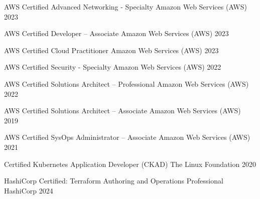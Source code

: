 


\begin{cvhonors}

  \cvhonor
    {AWS Certified Advanced Networking - Specialty} %
    {Amazon Web Services (AWS)} %
    {} %
    {2023} %

  \cvhonor
    {AWS Certified Developer – Associate} %
    {Amazon Web Services (AWS)} %
    {} %
    {2023} %

  \cvhonor
    {AWS Certified Cloud Practitioner} %
    {Amazon Web Services (AWS)} %
    {} %
    {2023} %

  \cvhonor
    {AWS Certified Security - Specialty} %
    {Amazon Web Services (AWS)} %
    {} %
    {2022} %

  \cvhonor
    {AWS Certified Solutions Architect – Professional} %
    {Amazon Web Services (AWS)} %
    {} %
    {2022} %

  \cvhonor
    {AWS Certified Solutions Architect – Associate} %
    {Amazon Web Services (AWS)} %
    {} %
    {2019} %

  \cvhonor
    {AWS Certified SysOps Administrator – Associate} %
    {Amazon Web Services (AWS)} %
    {} %
    {2021} %

  \cvhonor
    {Certified Kubernetes Application Developer (CKAD)} %
    {The Linux Foundation} %
    {} %
    {2020} %

  \cvhonor
    {HashiCorp Certified: Terraform Authoring and Operations Professional} %
    {HashiCorp} %
    {} %
    {2024} %


\end{cvhonors}
